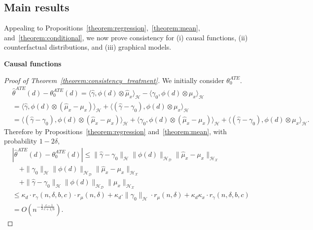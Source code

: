 \subsection{Main results}

Appealing to Propositions~\ref{theorem:regression},~\ref{theorem:mean}, and~\ref{theorem:conditional}, we now prove consistency for (i) causal functions, (ii) counterfactual distributions, and (iii) graphical models. 

\textbf{Causal functions}

\begin{proof}[Proof of Theorem~\ref{theorem:consistency_treatment}]
We initially consider $\theta_0^{ATE}$. 
    \begin{align*}
        &\hat{\theta}^{ATE}(d)-\theta_0^{ATE}(d)
        =\langle \hat{\gamma} , \phi(d)\otimes \hat{\mu}_x \rangle_{\mathcal{H}} - \langle \gamma_0 , \phi(d)\otimes \mu_x \rangle_{\mathcal{H}} \\
        &=\langle \hat{\gamma} , \phi(d)\otimes(\hat{\mu}_x-\mu_x) \rangle_{\mathcal{H}} + \langle (\hat{\gamma}-\gamma_0), \phi(d) \otimes \mu_x \rangle_{\mathcal{H}} \\
        &=\langle (\hat{\gamma}-\gamma_0), \phi(d)\otimes(\hat{\mu}_x-\mu_x) \rangle_{\mathcal{H}} + \langle \gamma_0, \phi(d)\otimes(\hat{\mu}_x-\mu_x) \rangle_{\mathcal{H}}+\langle (\hat{\gamma}-\gamma_0), \phi(d) \otimes \mu_x \rangle_{\mathcal{H}}.
    \end{align*}
    Therefore by Propositions~\ref{theorem:regression} and~\ref{theorem:mean}, with probability $1-2\delta$,
   \begin{align*}
       &|\hat{\theta}^{ATE}(d)-\theta_0^{ATE}(d)|\leq 
       \|\hat{\gamma}-\gamma_0\|_{\mathcal{H}}\|\phi(d)\|_{\mathcal{H}_{\mathcal{D}}} \|\hat{\mu}_x-\mu_x\|_{\mathcal{H}_{\mathcal{X}}}\\
       &\quad +
       \|\gamma_0\|_{\mathcal{H}}\|\phi(d)\|_{\mathcal{H}_{\mathcal{D}}}\|\hat{\mu}_x-\mu_x\|_{\mathcal{H}_{\mathcal{X}}} \\
       &\quad + 
       \|\hat{\gamma}-\gamma_0\|_{\mathcal{H}}\|\phi(d)\|_{\mathcal{H}_{\mathcal{D}}} \|\mu_x\|_{\mathcal{H}_{\mathcal{X}}}
      \\
      &\leq \kappa_d \cdot r_{\gamma}(n,\delta,b,c) \cdot r_{\mu}(n,\delta)+\kappa_d\cdot\|\gamma_0\|_{\mathcal{H}} \cdot r_{\mu}(n,\delta)+\kappa_d\kappa_x \cdot r_{\gamma}(n,\delta,b,c)\\
      &=O\left(n^{-\frac{1}{2}\frac{c-1}{c+1/b}}\right).
   \end{align*}

\end{proof}
